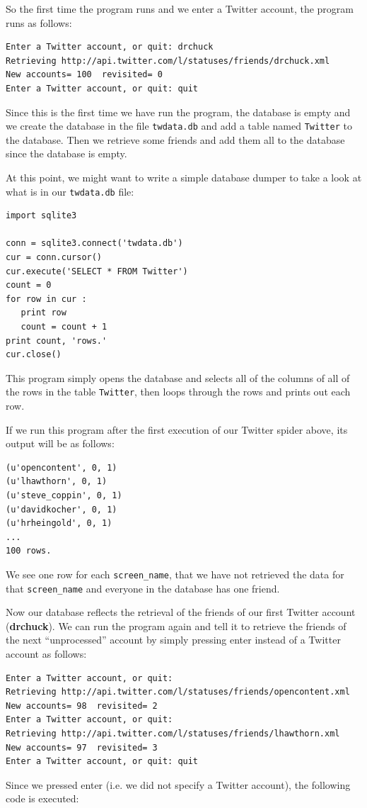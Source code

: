 \documentclass[11pt]{book}
\begin{document}
So the first time the program runs and we enter a Twitter account, the program
runs as follows:

\beforeverb
\begin{verbatim}
Enter a Twitter account, or quit: drchuck
Retrieving http://api.twitter.com/l/statuses/friends/drchuck.xml
New accounts= 100  revisited= 0
Enter a Twitter account, or quit: quit
\end{verbatim}
\afterverb
%
Since this is the first time we have run the program, the database
is empty and we create the database in the file {\tt twdata.db} and
add a table named {\tt Twitter} to the database.  Then we retrieve
some friends and add them all to the database since the database is
empty.

At this point, we might want to write a simple database dumper
to take a look at what is in our {\tt twdata.db} file:

\beforeverb
\begin{verbatim}
import sqlite3

conn = sqlite3.connect('twdata.db')
cur = conn.cursor()
cur.execute('SELECT * FROM Twitter')
count = 0
for row in cur :
   print row
   count = count + 1
print count, 'rows.'
cur.close()
\end{verbatim}
\afterverb
%
This program simply opens the database and selects all of the 
columns of all of the rows in the table {\tt Twitter}, then 
loops through the rows and prints out each row.

If we run this program after the first execution of our Twitter
spider above, its output will be as follows:

\beforeverb
\begin{verbatim}
(u'opencontent', 0, 1)
(u'lhawthorn', 0, 1)
(u'steve_coppin', 0, 1)
(u'davidkocher', 0, 1)
(u'hrheingold', 0, 1)
...
100 rows.
\end{verbatim}
\afterverb
%
We see one row for each \verb"screen_name", that we 
have not retrieved the data for that \verb"screen_name" and 
everyone in the database has one friend.

Now our database reflects the retrieval of the friends of 
our first Twitter account ({\bf drchuck}).  We can run the program
again and tell it to retrieve the friends of the next 
``unprocessed'' account by simply pressing enter instead of
a Twitter account as follows:

\beforeverb
\begin{verbatim}
Enter a Twitter account, or quit: 
Retrieving http://api.twitter.com/l/statuses/friends/opencontent.xml
New accounts= 98  revisited= 2
Enter a Twitter account, or quit: 
Retrieving http://api.twitter.com/l/statuses/friends/lhawthorn.xml
New accounts= 97  revisited= 3
Enter a Twitter account, or quit: quit
\end{verbatim}
\afterverb
%
Since we pressed enter (i.e. we did not specify a Twitter account),
the following code is executed:
\end{document}
